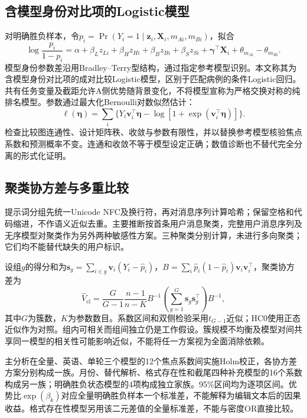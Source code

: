 \documentclass[UTF8,11pt,a4paper,fontset=windows]{ctexart}
\numberwithin{equation}{section}
\begin{document}
\subsection{含模型身份对比项的Logistic模型}
对明确胜负样本，令$p_i=\Pr(Y_i=1\mid\bm z_i,\bm X_i,m_{Ai},m_{Bi})$，拟合
\begin{equation}\label{eq:logit}
 \log\frac{p_i}{1-p_i}=\alpha+\beta_Lz_{Li}+\beta_Hz_{Hi}
 +\beta_Bz_{Bi}+\beta_Sz_{Si}+\bm\gamma^\top\bm X_i
 +\theta_{m_{Ai}}-\theta_{m_{Bi}}.
\end{equation}
模型身份参数差沿用Bradley--Terry型结构\cite{bradley,firth}，通过指定参考模型识别。本文称其为含模型身份对比项的成对比较Logistic模型，区别于匹配病例的条件Logistic回归。共有任务变量及截距允许A侧优势随背景变化，不将模型宣称为严格交换对称的纯排名模型。参数通过最大化Bernoulli对数似然估计：
\begin{equation}
 \ell(\bm\eta)=\sum_i\{Y_i\bm v_i^\top\bm\eta-\log[1+\exp(\bm v_i^\top\bm\eta)]\}.
\end{equation}
检查比较图连通性、设计矩阵秩、收敛与参数有限性，并以替换参考模型核验焦点系数和预测概率不变。连通和收敛不等于模型设定正确；数值诊断也不替代完全分离的形式化证明。

\subsection{聚类协方差与多重比较}
提示词分组先统一Unicode NFC及换行符，再对消息序列计算哈希；保留空格和代码缩进，不作语义近似去重。主要推断按首条用户消息聚类，完整用户消息序列及无序模型对聚类作为另外两种敏感性方案。三种聚类分别计算，未进行多向聚类；它们均不能替代缺失的用户标识。

设组$g$的得分和为$\bm s_g=\sum_{i\in g}\bm v_i(Y_i-\widehat p_i)$，$B=\sum_i\widehat p_i(1-\widehat p_i)\bm v_i\bm v_i^\top$，聚类协方差为\cite{cameron}
\begin{equation}
 \widehat V_{\mathrm{cl}}=\frac{G}{G-1}\frac{n-1}{n-K}
 B^{-1}\left(\sum_{g=1}^G\bm s_g\bm s_g^\top\right)B^{-1},
\end{equation}
其中$G$为簇数，$K$为参数数目。系数区间和双侧检验采用$t_{G-1}$近似；HC0使用正态近似作为对照。组内可相关而组间独立仍是工作假设。簇规模不均衡及模型对间共享同一模型的相关性可能影响近似，不能将任一方案视为全面消除依赖。

主分析在全量、英语、单轮三个模型的12个焦点系数间实施Holm校正，各协方差方案分别构成一族。月份、替代解析、格式存在性和截尾四种补充模型的16个系数构成另一族；明确胜负状态模型的4项构成独立家族。95\%区间均为逐项区间。优势比$\exp(\beta_k)$对应全量明确胜负样本一个标准差，不能解释为编辑文本后的因果收益。格式存在性模型另用该二元差值的全量标准差，不能与密度OR直接比较。
\end{document}
